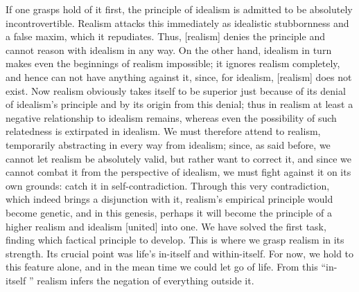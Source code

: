 If one grasps hold of it first,
the principle of idealism is
admitted to be absolutely incontrovertible.
Realism attacks this immediately
as idealistic stubbornness and a false maxim,
which it repudiates.
Thus, [realism] denies the principle
and cannot reason with idealism in any way.
On the other hand, idealism in turn makes
even the beginnings of realism impossible;
it ignores realism completely,
and hence can not have anything against it,
since, for idealism, [realism] does not exist.
Now realism obviously takes itself to be superior
just because of its denial of idealism’s principle
and by its origin from this denial;
thus in realism at least
a negative relationship to idealism remains,
whereas even the possibility of such relatedness
is extirpated in idealism.
We must therefore attend to realism,
temporarily abstracting in every way from idealism;
since, as said before, we cannot let
realism be absolutely valid,
but rather want to correct it,
and since we cannot combat it
from the perspective of idealism,
we must fight against it on its own grounds:
catch it in self-contradiction.
Through this very contradiction,
which indeed brings a disjunction with it,
realism’s empirical principle would become genetic,
and in this genesis, perhaps it will become
the principle of a higher realism and idealism [united] into one.
We have solved the first task,
finding which factical principle to develop.
This is where we grasp realism in its strength.
Its crucial point was life’s in-itself and within-itself.
For now, we hold to this feature alone,
and in the mean time we could let go of life.
From this “in-itself ” realism infers
the negation of everything outside it.

